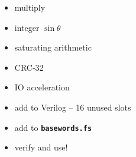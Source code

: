 \documentclass[compress,mathserif]{beamer}
\newcommand{\mach}[1]{\texttt{\textbf{#1}}}
\begin{document}
\begin{frame}
\begin{itemize}
   \item multiply
   \item integer $\sin\theta$
   \item saturating arithmetic
   \item CRC-32
   \item IO acceleration
\end{itemize}
\end{frame}

\begin{frame}
\begin{itemize}
   \item add to Verilog -- 16 unused slots
   \item add to \mach{basewords.fs}
   \item verify and use!
\end{itemize}
\end{frame}

\emptyslide
\end{document}
